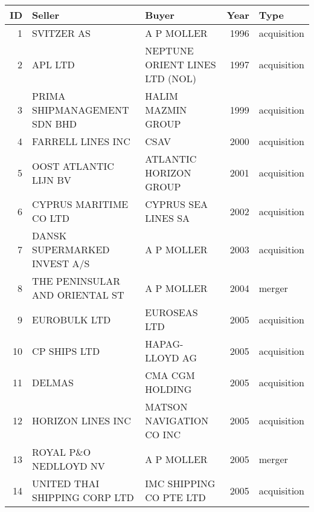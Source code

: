 
\begin{tabular}[t]{rllrl}
\toprule
ID & Seller & Buyer & Year & Type\\
\midrule
1 & SVITZER AS & A P MOLLER & 1996 & acquisition\\
2 & APL LTD & NEPTUNE ORIENT LINES LTD (NOL) & 1997 & acquisition\\
3 & PRIMA SHIPMANAGEMENT SDN BHD & HALIM MAZMIN GROUP & 1999 & acquisition\\
4 & FARRELL LINES INC & CSAV & 2000 & acquisition\\
5 & OOST ATLANTIC LIJN BV & ATLANTIC HORIZON GROUP & 2001 & acquisition\\
6 & CYPRUS MARITIME CO LTD & CYPRUS SEA LINES SA & 2002 & acquisition\\
7 & DANSK SUPERMARKED INVEST A/S & A P MOLLER & 2003 & acquisition\\
8 & THE PENINSULAR AND ORIENTAL ST & A P MOLLER & 2004 & merger\\
9 & EUROBULK LTD & EUROSEAS LTD & 2005 & acquisition\\
10 & CP SHIPS LTD & HAPAG-LLOYD AG & 2005 & acquisition\\
11 & DELMAS & CMA CGM HOLDING & 2005 & acquisition\\
12 & HORIZON LINES INC & MATSON NAVIGATION CO INC & 2005 & acquisition\\
13 & ROYAL P\&O NEDLLOYD NV & A P MOLLER & 2005 & merger\\
14 & UNITED THAI SHIPPING CORP LTD & IMC SHIPPING CO PTE LTD & 2005 & acquisition\\
\bottomrule
\end{tabular}
